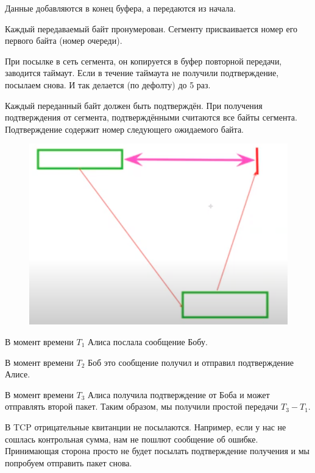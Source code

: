 Данные добавляются в конец буфера, а передаются из начала. 

Каждый передаваемый байт пронумерован. Сегменту присваивается номер его первого байта (номер очереди).

При посылке в сеть сегмента, он копируется в буфер повторной передачи, заводится таймаут. Если в течение таймаута не получили подтверждение, посылаем снова. И так делается (по дефолту) до 5 раз.

Каждый переданный байт должен быть подтверждён. При получения подтверждения от сегмента, подтверждёнными считаются все байты сегмента. Подтверждение содержит номер следующего ожидаемого байта.

\begin{figure}[H]
  \centering
  \includegraphics[width=15cm]{images/03/03}
\end{figure}

В момент времени $T_1$ Алиса послала сообщение Бобу.

В момент времени $T_2$ Боб это сообщение получил и отправил подтверждение Алисе.

В момент времени $T_3$ Алиса получила подтверждение от Боба и может отправлять второй пакет. Таким образом, мы получили простой передачи $T_3-T_1$.

В TCP отрицательные квитанции не посылаются. Например, если у нас не сошлась контрольная сумма, нам не пошлют сообщение об ошибке. Принимающая сторона просто не будет посылать подтверждение получения и мы попробуем отправить пакет снова.


